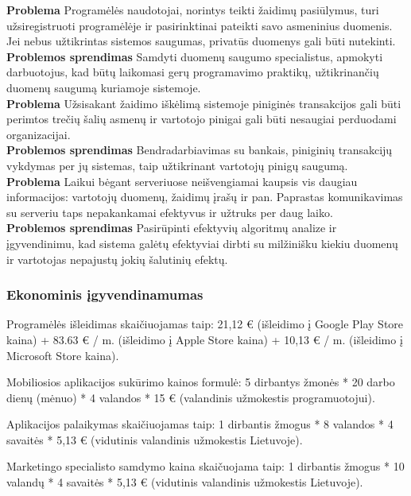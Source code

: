 \documentclass{VUMIFPSkursinis}
\begin{document}
		\noindent \textbf{Problema} Programėlės naudotojai, norintys teikti žaidimų pasiūlymus, turi užsiregistruoti programėlėje ir pasirinktinai pateikti savo asmeninius duomenis. Jei nebus užtikrintas sistemos saugumas, privatūs duomenys gali būti nutekinti.\\
		\noindent \textbf{Problemos sprendimas} Samdyti duomenų saugumo specialistus, apmokyti darbuotojus, kad būtų laikomasi gerų programavimo praktikų, užtikrinančių duomenų saugumą kuriamoje sistemoje. \\
		
		\noindent \textbf{Problema} Užsisakant žaidimo iškėlimą sistemoje piniginės transakcijos gali būti perimtos trečių šalių asmenų ir vartotojo pinigai gali būti nesaugiai perduodami organizacijai.\\
		\noindent \textbf{Problemos sprendimas} Bendradarbiavimas su bankais, piniginių transakcijų vykdymas per jų sistemas, taip užtikrinant vartotojų pinigų saugumą. \\
		
		\noindent \textbf{Problema} Laikui bėgant serveriuose neišvengiamai kaupsis vis daugiau informacijos: vartotojų duomenų, žaidimų įrašų ir pan. Paprastas komunikavimas su serveriu taps nepakankamai efektyvus ir užtruks per daug laiko.\\
		\noindent \textbf{Problemos sprendimas} Pasirūpinti efektyvių algoritmų analize ir įgyvendinimu, kad sistema galėtų efektyviai dirbti su milžinišku kiekiu duomenų ir vartotojas nepajustų jokių šalutinių efektų. \\
		
	\subsubsection{Ekonominis įgyvendinamumas}	
		Programėlės išleidimas skaičiuojamas taip: 21,12 € (išleidimo į Google 
		Play Store kaina) + 83.63 € / m. (išleidimo į Apple Store kaina)  + 10,13 
		€ / m. (išleidimo į Microsoft Store kaina).
		
		Mobiliosios aplikacijos sukūrimo kainos formulė: 5 dirbantys žmonės * 20 
		darbo dienų (mėnuo) * 4 valandos * 15 € (valandinis užmokestis 
		programuotojui).

		Aplikacijos palaikymas skaičiuojamas taip: 1 dirbantis žmogus * 8 valandos * 4 
		savaitės * 5,13 € (vidutinis valandinis užmokestis Lietuvoje).

		Marketingo specialisto samdymo kaina skaičuojama taip: 1 dirbantis žmogus * 
		10 valandų * 4 savaitės * 5,13 € (vidutinis valandinis užmokestis Lietuvoje).
\end{document}
